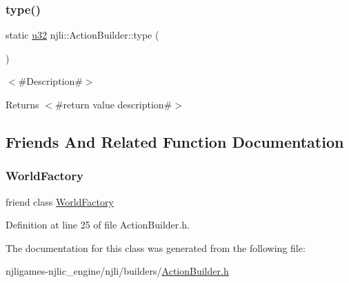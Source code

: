 \subsubsection{\texorpdfstring{type()}{type()}}
{\footnotesize\ttfamily static \mbox{\hyperlink{_util_8h_a10e94b422ef0c20dcdec20d31a1f5049}{u32}} njli\+::\+Action\+Builder\+::type (\begin{DoxyParamCaption}{ }\end{DoxyParamCaption})\hspace{0.3cm}{\ttfamily [static]}}

$<$\#\+Description\#$>$

\begin{DoxyReturn}{Returns}
$<$\#return value description\#$>$ 
\end{DoxyReturn}


\subsection{Friends And Related Function Documentation}
\mbox{\label{classnjli_1_1_action_builder_acb96ebb09abe8f2a37a915a842babfac}} 
\subsubsection{\texorpdfstring{World\+Factory}{WorldFactory}}
{\footnotesize\ttfamily friend class \mbox{\hyperlink{classnjli_1_1_world_factory}{World\+Factory}}\hspace{0.3cm}{\ttfamily [friend]}}



Definition at line 25 of file Action\+Builder.\+h.



The documentation for this class was generated from the following file\+:\begin{DoxyCompactItemize}
\item 
njligames-\/njlic\+\_\+engine/njli/builders/\mbox{\hyperlink{_action_builder_8h}{Action\+Builder.\+h}}\end{DoxyCompactItemize}
